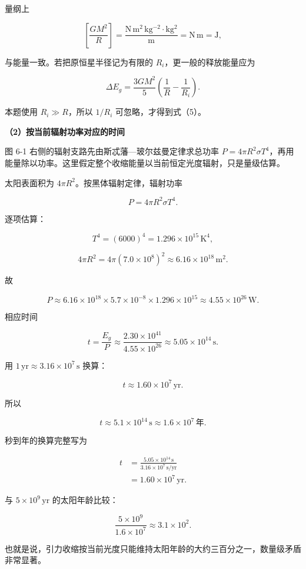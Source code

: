 \documentclass[12pt,a4paper,UTF8]{ctexart}
\begin{document}
量纲上

\[\left[\frac{GM^2}{R}\right]
=\frac{\mathrm{N\,m^2\,kg^{-2}}\cdot\mathrm{kg^2}}{\mathrm m}
=\mathrm{N\,m}=\mathrm J,\]

与能量一致。若把原恒星半径记为有限的 \(R_i\)，更一般的释放能量应为

\[\Delta E_g=\frac{3GM^2}{5}
\left(\frac1R-\frac1{R_i}\right).\]

本题使用 \(R_i\gg R\)，所以 \(1/R_i\) 可忽略，才得到式（5）。

\textbf{（2）按当前辐射功率对应的时间}

图 6-1 右侧的辐射支路先由斯忒藩---玻尔兹曼定律求总功率
\(P=4\pi R^2\sigma T^4\)，再用能量除以功率。这里假定整个收缩能量以当前恒定光度辐射，只是量级估算。

太阳表面积为 \(4\pi R^2\)。按黑体辐射定律，辐射功率

\[P=4\pi R^2\sigma T^4. \tag{7}\]

逐项估算：

\[T^4=(6000)^4=1.296\times10^{15}\,\mathrm K^4,\]

\[4\pi R^2=4\pi(7.0\times10^8)^2
\approx6.16\times10^{18}\,\mathrm{m^2}.\]

故

\[P\approx6.16\times10^{18}
\times5.7\times10^{-8}
\times1.296\times10^{15}
\approx4.55\times10^{26}\,\mathrm W. \tag{8}\]

相应时间

\[t=\frac{E_g}{P}
\approx\frac{2.30\times10^{41}}{4.55\times10^{26}}
\approx5.05\times10^{14}\,\mathrm s. \tag{9}\]

用 \(1\,\mathrm{yr}\approx3.16\times10^7\,\mathrm s\) 换算：

\[t\approx1.60\times10^7\,\mathrm{yr}. \tag{10}\]

所以

\[\boxed{t\approx5.1\times10^{14}\,\mathrm s
\approx1.6\times10^7\,\text{年}}.\]

秒到年的换算完整写为

\[\begin{aligned}
t
&=\frac{5.05\times10^{14}\,\mathrm s}
{3.16\times10^7\,\mathrm{s/yr}}\\
&=1.60\times10^7\,\mathrm{yr}.
\end{aligned}\]

与 \(5\times10^9\,\mathrm{yr}\) 的太阳年龄比较：

\[\frac{5\times10^9}{1.6\times10^7}\approx3.1\times10^2.\]

也就是说，引力收缩按当前光度只能维持太阳年龄的大约三百分之一，数量级矛盾非常显著。
\end{document}
